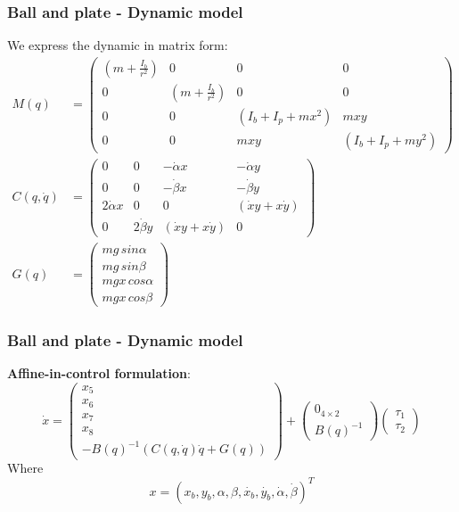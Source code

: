 %
\begin{frame}
\frametitle{Ball and plate - Dynamic model}
%
We express the dynamic in matrix form:
%
\begin{equation*}
\begin{aligned}
M(q) &=%
\begin{pmatrix}
	\left(m + \frac{I_b}{r^2}\right) &0 &0 &0\\
	0 &\left(m + \frac{I_b}{r^2}\right) &0 &0\\
	0 &0 &\left(I_b + I_p + mx^2\right) &mxy\\
	0 &0 &mxy &\left(I_b + I_p + my^2\right)
\end{pmatrix}\\
C(q,\dot{q}) &=%
\begin{pmatrix}
	0 &0 &-\dot{\alpha} x &-\dot{\alpha} y\\
	0 &0 &-\dot{\beta} x &-\dot{\beta} y\\
	2\dot{\alpha}x &0 &0 &\left(\dot{x}y+x\dot{y}\right)\\
	0 &2\dot{\beta}y &\left(\dot{x}y+x\dot{y}\right) &0
\end{pmatrix}\\
G(q) &=%
\begin{pmatrix}
	mg\,sin\alpha\\
	mg\,sin\beta\\
	mgx\,cos\alpha\\
	mgx\,cos\beta
\end{pmatrix}
\end{aligned}
\end{equation*}
\end{frame}
%
\begin{frame}
\frametitle{Ball and plate - Dynamic model}
%
\textbf{Affine-in-control formulation}:
\begin{equation}
	\dot{x} =%
	\begin{pmatrix}
	x_5\\ x_6\\ x_7\\ x_8\\ -B(q)^{-1}\left(C(q,\dot{q})\dot{q}+G(q)\right)
	\end{pmatrix}
	+
	\begin{pmatrix}
		0_{4\times2}\\
		B(q)^{-1}
	\end{pmatrix}
	\begin{pmatrix}
		\tau_1\\
	 	\tau_2
	\end{pmatrix}
\end{equation}
Where
\[x = (x_b, y_b, \alpha, \beta, \dot{x_b}, \dot{y_b}, \dot{\alpha}, \dot{\beta})^T\]
\end{frame}
